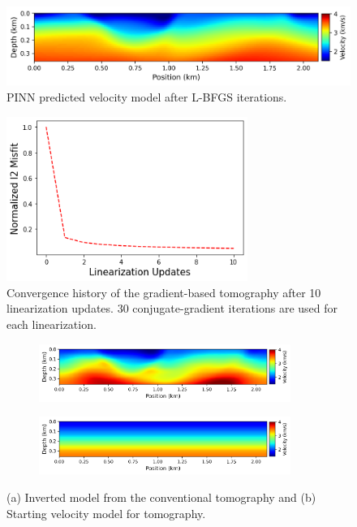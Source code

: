 \begin{figure}
 \centering
 \includegraphics[width=1.0\textwidth]{figures/chap03_pinn_enabled/thesis_model2_pinn} 
 \caption{PINN predicted velocity model after L-BFGS iterations.}
 \label{fig:thesis_model2_pinn}
\end{figure}

\begin{figure}
 \centering
 \includegraphics[width=0.7\textwidth]{figures/chap03_pinn_enabled/convergence_curve2} 
 \caption{Convergence history of the gradient-based tomography after 10 linearization updates. 30 conjugate-gradient iterations are used for each linearization.}
 \label{fig:convergence_curve2}
\end{figure}

\begin{figure}
       \centering
       \begin{subfigure}[b]{1.\textwidth}
               \centering
               \includegraphics[width=0.9\textwidth]{figures/chap03_pinn_enabled/model2_tomo} 
               \caption{}
               \label{fig:model2_tomo}
       \end{subfigure}
       \begin{subfigure}[b]{1.\textwidth}
               \centering
               \includegraphics[width=0.9\textwidth]{figures/chap03_pinn_enabled/model2_init}
               \caption{}
               \label{fig:model2_init}
       \end{subfigure}
       \caption{(a) Inverted model from the conventional tomography and (b) Starting velocity model for tomography.}
       \label{fig:std_tomo2}
\end{figure}

